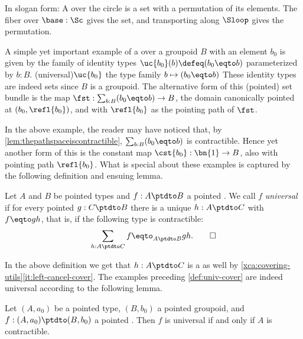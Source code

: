 In slogan form: A \covering over the circle is a set with
a permutation of its elements.
The fiber over $\base:\Sc$ gives the set,
and transporting along $\Sloop$ gives the permutation.

\begin{example}\label{def:universalcover}
A simple yet important example of a \covering over a groupoid
$B$ with an element $b_0$ is given by the family of identity types 
$\uc{b_0}(b) \defeq (b_0 \eqto b)$ parameterized by $b:B$.
\glossary(universal){$\protect\uc{b_0}$}%
{the type family $b \mapsto (b_0 \protect\eqto b)$} 
These identity types are indeed sets since $B$ is a groupoid. 
The alternative form
of this (pointed) set bundle is the map $\fst: \sum_{b:B}(b_0\eqto b)\to B$,
the domain canonically pointed at $(b_0,\refl{b_0})$, and with 
$\refl{b_0}$ as the pointing path of $\fst$.

In the above example, the reader may have noticed that,
by \cref{lem:thepathspaceiscontractible}, 
$\sum_{b:B}(b_0\eqto b)$ is contractible. Hence yet another
form of this \covering is the constant map 
$\cst{b_0}:\bn{1}\to B$, also with pointing path $\refl{b_0}$.
What is special about these examples is captured by the
following definition and ensuing lemma.
\end{example}

\begin{definition}\label{def:univ-cover}
Let $A$ and $B$ be pointed types and $f: A\ptdto B$ a pointed \covering.
We call $f$ \emph{universal} if for every pointed \covering $g: C\ptdto B$
there is a unique $h: A\ptdto C$ with $f\eqto gh$, that is, if
the following type is contractible:
\[\sum_{h: A\ptdto C} f\eqto_{A\ptdto B} gh.\qedhere\]
\end{definition}

In the above definition we get that $h: A\ptdto C$ is a
\covering as well by \cref{xca:covering-utils}\ref{it:left-cancel-cover}.
The examples preceding \cref{def:univ-cover} are indeed universal
\coverings according to the following lemma.

\begin{lemma}\label{lem:univ-cover-of-groupoid}
Let $(A,a_0)$ be a pointed type, $(B,b_0)$ a pointed
groupoid, and $f : (A,a_0)\ptdto (B,b_0)$ a pointed \covering. 
Then $f$ is universal if and only if $A$ is contractible. 
\end{lemma}

